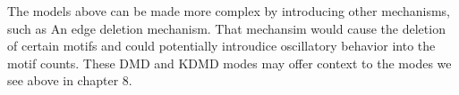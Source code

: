 The models above can be made more complex by introducing other mechanisms, such as An
edge deletion mechanism. That mechansim would cause the deletion of certain motifs and 
could potentially introudice oscillatory behavior into the motif counts. These
DMD and KDMD modes may offer context to the modes we see above in chapter 8. 


